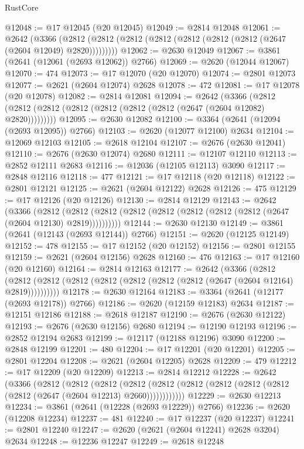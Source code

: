 \begin{lexlean}{RustCore}
\begin{coremodule}
@12048 := @17 @12045 (@20 @12045)
@12049 := @2814 @12048
@12061 := @2642
    (@3366 (@2812 (@2812 (@2812 (@2812 (@2812 (@2812 (@2812 (@2647 (@2604 @12049) @2820)))))))))
@12062 := @2630 @12049
@12067 := @3861 (@2641 (@12061 (@2693 @12062)) @2766)
@12069 := @2620 (@12044 @12067)
@12070 := 474
@12073 := @17 @12070 (@20 @12070)
@12074 := @2801 @12073
@12077 := @2621 (@2604 @12074) @2628
@12078 := 472
@12081 := @17 @12078 (@20 @12078)
@12082 := @2814 @12081
@12094 := @2642
    (@3366 (@2812 (@2812 (@2812 (@2812 (@2812 (@2812 (@2812 (@2647 (@2604 @12082) @2820)))))))))
@12095 := @2630 @12082
@12100 := @3364 (@2641 (@12094 (@2693 @12095)) @2766)
@12103 := @2620 (@12077 @12100) @2634
@12104 := @12069 @12103
@12105 := @2618 @12104
@12107 := @2676 (@2630 @12041)
@12110 := @2676 (@2630 @12074) @2680
@12111 := @12107 @12110
@12113 := @2852 @12111 @2683
@12116 := @12036 (@12105 @12113) @3090
@12117 := @2848 @12116
@12118 := 477
@12121 := @17 @12118 (@20 @12118)
@12122 := @2801 @12121
@12125 := @2621 (@2604 @12122) @2628
@12126 := 475
@12129 := @17 @12126 (@20 @12126)
@12130 := @2814 @12129
@12143 := @2642
    (@3366
      (@2812 (@2812 (@2812 (@2812 (@2812 (@2812 (@2812 (@2812 (@2647 (@2604 @12130) @2819))))))))))
@12144 := @2630 @12130
@12149 := @3861 (@2641 (@12143 (@2693 @12144)) @2766)
@12151 := @2620 (@12125 @12149)
@12152 := 478
@12155 := @17 @12152 (@20 @12152)
@12156 := @2801 @12155
@12159 := @2621 (@2604 @12156) @2628
@12160 := 476
@12163 := @17 @12160 (@20 @12160)
@12164 := @2814 @12163
@12177 := @2642
    (@3366
      (@2812 (@2812 (@2812 (@2812 (@2812 (@2812 (@2812 (@2812 (@2647 (@2604 @12164) @2819))))))))))
@12178 := @2630 @12164
@12183 := @3364 (@2641 (@12177 (@2693 @12178)) @2766)
@12186 := @2620 (@12159 @12183) @2634
@12187 := @12151 @12186
@12188 := @2618 @12187
@12190 := @2676 (@2630 @12122)
@12193 := @2676 (@2630 @12156) @2680
@12194 := @12190 @12193
@12196 := @2852 @12194 @2683
@12199 := @12117 (@12188 @12196) @3090
@12200 := @2848 @12199
@12201 := 480
@12204 := @17 @12201 (@20 @12201)
@12205 := @2801 @12204
@12208 := @2621 (@2604 @12205) @2628
@12209 := 479
@12212 := @17 @12209 (@20 @12209)
@12213 := @2814 @12212
@12228 := @2642
    (@3366
      (@2812
        (@2812
          (@2812
            (@2812 (@2812 (@2812 (@2812 (@2812 (@2812 (@2812 (@2647 (@2604 @12213) @2660))))))))))))
@12229 := @2630 @12213
@12234 := @3861 (@2641 (@12228 (@2693 @12229)) @2766)
@12236 := @2620 (@12208 @12234)
@12237 := 481
@12240 := @17 @12237 (@20 @12237)
@12241 := @2801 @12240
@12247 := @2620 (@2621 (@2604 @12241) @2628 @3204) @2634
@12248 := @12236 @12247
@12249 := @2618 @12248

\end{coremodule}
\end{lexlean}
